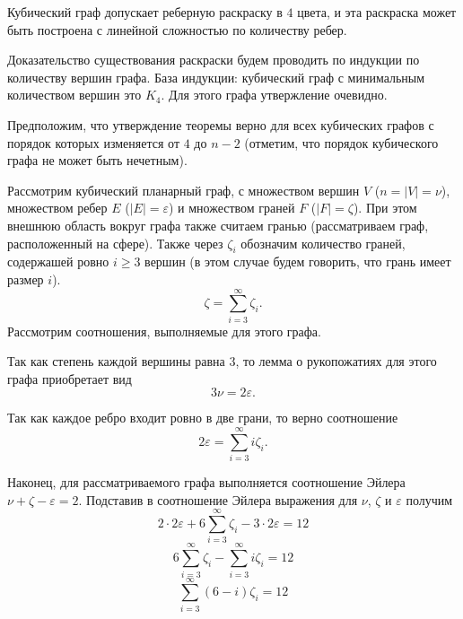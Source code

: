 \begin{lemma}\label{lem:text_3_graph_prim_coloring4}
Кубический граф допускает реберную раскраску в $4$ цвета, и эта раскраска может быть построена с линейной сложностью по количеству ребер.
\end{lemma}

Доказательство существования раскраски будем проводить по индукции по количеству вершин графа.
База индукции: кубический граф с минимальным количеством вершин это $K_4$.
Для этого графа утвержление очевидно.

Предположим, что утверждение теоремы верно для всех кубических графов с порядок которых изменяется от $4$ до $n - 2$ (отметим, что порядок кубического графа не может быть нечетным).

Рассмотрим кубический планарный граф, с множеством вершин $V$ ($n = |V| = \nu$), множеством ребер $E$ ($|E| = \varepsilon$) и множеством граней $F$ ($|F| = \zeta$).
При этом внешнюю область вокруг графа также считаем гранью (рассматриваем граф, расположенный на сфере).
Также через $\zeta_i$ обозначим количество граней, содержашей ровно $i \ge 3$ вершин (в этом случае будем говорить, что грань имеет размер $i$).
\begin{equation}
	\zeta = \sum_{i = 3}^{\infty}{\zeta_i}.
\end{equation}
Рассмотрим соотношения, выполняемые для этого графа.

Так как степень каждой вершины равна $3$, то лемма о рукопожатиях для этого графа приобретает вид
\begin{equation}
	3 \nu = 2 \varepsilon.
\end{equation}

Так как каждое ребро входит ровно в две грани, то верно соотношение
\begin{equation}
	2 \varepsilon = \sum_{i = 3}^{\infty}{i \zeta_i}.
\end{equation}

Наконец, для рассматриваемого графа выполняется соотношение Эйлера $\nu + \zeta - \varepsilon = 2$.
Подставив в соотношение Эйлера выражения для $\nu$, $\zeta$ и $\varepsilon$ получим
\begin{equation}
	2 \cdot 2\varepsilon + 6 \sum_{i = 3}^{\infty}{\zeta_i} - 3 \cdot 2\varepsilon = 12
\end{equation}
\begin{equation}
	6 \sum_{i = 3}^{\infty}{\zeta_i} - \sum_{i = 3}^{\infty}{i \zeta_i} = 12
\end{equation}
\begin{equation}\label{eqn:text_3_graph_prim_euler}
	\sum_{i = 3}^{\infty}{(6 - i) \zeta_i} = 12
\end{equation}

